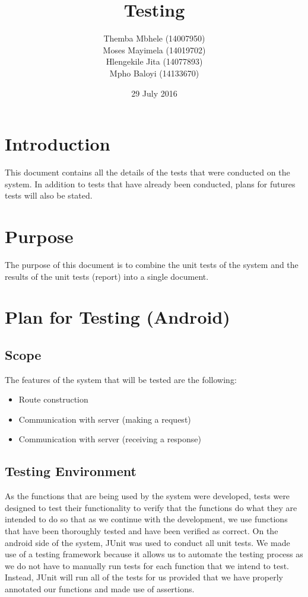 \documentclass{article}
\title{Testing}
\author{Themba Mbhele (14007950)\\
        Moses Mayimela (14019702)\\
        Hlengekile Jita (14077893)\\
        Mpho Baloyi (14133670)\\
        }
\date{29 July 2016}
\begin{document}
\maketitle

\section{Introduction}
This document contains all the details of the tests that were conducted on the system. In addition to tests that have already been conducted, plans for futures tests will also be stated.

\section{Purpose}
The purpose of this document is to combine the unit tests of the system and the results of the unit tests (report) into a single document.

\section{Plan for Testing (Android)}
\subsection{Scope}
The features of the system that will be tested are the following:
\begin{itemize}
    \item Route construction
    \item Communication with server (making a request)
    \item Communication with server (receiving a response)
\end{itemize}
\subsection{Testing Environment}
As the functions that are being used by the system were developed, tests were designed to test their functionality to verify that the functions do what they are intended to do so that as we continue with the development, we use functions that have been thoroughly tested and have been verified as correct.
On the android side of the system, JUnit was used to conduct all unit tests. We
made use of a testing framework because it allows us to automate the testing process as we do not have to manually run tests for each function that we intend to test. Instead, JUnit will run all of the tests for us provided that we
have properly annotated our functions and made use of assertions.
\end{document}

